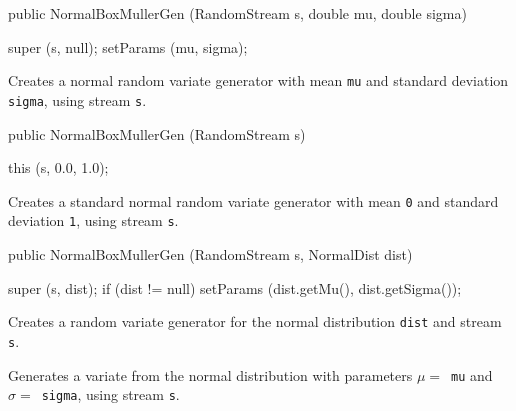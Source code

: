 \begin{code}

   public NormalBoxMullerGen (RandomStream s, double mu, double sigma) \begin{hide} {
      super (s, null);
      setParams (mu, sigma);
   }\end{hide}
\end{code} 
\begin{tabb}  Creates a normal random variate generator with mean \texttt{mu}
  and standard deviation \texttt{sigma}, using stream \texttt{s}. 
\end{tabb}
\begin{code}

   public NormalBoxMullerGen (RandomStream s) \begin{hide} {
      this (s, 0.0, 1.0);
   }\end{hide}
\end{code} 
\begin{tabb}  Creates a standard normal random variate generator with mean
  \texttt{0} and standard deviation \texttt{1}, using stream \texttt{s}. 
\end{tabb}
\begin{code}

   public NormalBoxMullerGen (RandomStream s, NormalDist dist) \begin{hide} {
      super (s, dist);
      if (dist != null)
         setParams (dist.getMu(), dist.getSigma());
   }\end{hide}
\end{code} 
 \begin{tabb}  Creates a random variate generator for the normal distribution 
  \texttt{dist} and stream \texttt{s}. 
 \end{tabb}

 \begin{tabb}  Generates a variate from the normal distribution with
   parameters $\mu = $~\texttt{mu} and $\sigma = $~\texttt{sigma}, using
   stream \texttt{s}.
 \end{tabb}

